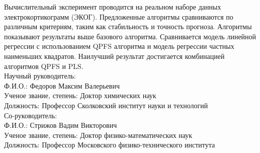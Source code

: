 \documentclass[12pt,oneside]{article}
\theoremstyle{definition}
\begin{document}
Вычислительный эксперимент проводится на реальном наборе данных электрокортикограмм (ЭКОГ). 
Предложенные алгоритмы сравниваются по различным критериям, таким как стабильность и точность прогноза.
Алгоритмы показывают результаты выше базового алгоритма.
Сравнивается модель линейной регрессии с использованием QPFS алгоритма и модель регрессии частных наименьших квадратов.
Наилучший результат достигается комбинацией алгоритмов QPFS и PLS.
\\[5mm]
Научный руководитель: \\
Ф.И.О.: Федоров Максим Валерьевич \\
Ученое звание, степень: Доктор химических наук \\
Должность: Профессор Сколковский институт науки и технологий \\[5mm]
Со-руководитель: \\
Ф.И.О.: Стрижов Вадим Викторович \\
Ученое звание, степень: Доктор физико-математических наук \\
Должность: Профессор Московского физико-технического института
\end{document}
